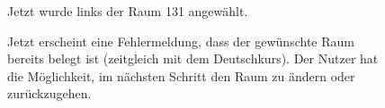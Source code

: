 \documentclass{swp1}
\begin{document}
\begin{figure}
\caption{Jetzt wurde links der Raum 131 angewählt. }
\label{ab4}
\end{figure}

\begin{figure}
\caption{Jetzt erscheint eine Fehlermeldung, dass der gewünschte Raum bereits belegt ist (zeitgleich mit dem Deutschkurs). Der Nutzer hat die Möglichkeit, im nächsten Schritt den Raum zu ändern oder zurückzugehen.}
\label{ab5}
\end{figure}
\end{document}
